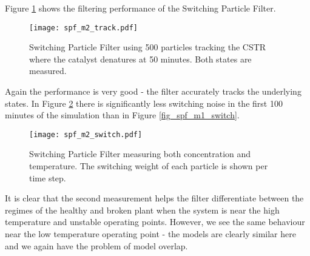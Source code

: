 Figure \ref{fig_spf_m2_track} shows the filtering performance of the Switching Particle Filter. 
\begin{figure}[H] 
\centering
\texttt{[image: spf\_m2\_track.pdf]}
\caption{Switching Particle Filter using 500 particles tracking the CSTR where the catalyst denatures at 50 minutes. Both states are measured.}
\label{fig_spf_m2_track}
\end{figure}
Again the performance is very good - the filter accurately tracks the underlying states. In Figure \ref{fig_spf_m2_switch} there is significantly less switching noise in the first 100 minutes of the simulation than in Figure \ref{fig_spf_m1_switch}.
\begin{figure}[H] 
\centering
\texttt{[image: spf\_m2\_switch.pdf]}
\caption{Switching Particle Filter measuring both concentration and temperature. The switching weight of each particle is shown per time step.}
\label{fig_spf_m2_switch}
\end{figure} 
It is clear that the second measurement helps the filter differentiate between the regimes of the healthy and broken plant when the system is near the high temperature and unstable operating points. However, we see the same behaviour near the low temperature operating point - the models are clearly similar here and we again have the problem of model overlap.